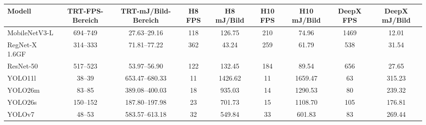 \begin{tabular}{l cc S[table-format=4.0] S[table-format=4.2] S[table-format=4.0] S[table-format=4.2] S[table-format=4.0] S[table-format=4.2]}
\toprule
Modell & TRT-FPS-Bereich & TRT-mJ/Bild-Bereich & {H8 FPS} & {H8 mJ/Bild} & {H10 FPS} & {H10 mJ/Bild} & {DeepX FPS} & {DeepX mJ/Bild} \\
\midrule
MobileNetV3-L & 694--749 & 27.63--29.16 & 118 & 126.75 & 210 & 74.96 & 1469 & 12.01 \\
RegNet-X 1.6GF & 314--333 & 71.81--77.22 & 362 & 43.24 & 259 & 61.79 & 538 & 31.54 \\
ResNet-50 & 517--523 & 53.97--56.90 & 122 & 132.45 & 184 & 89.54 & 656 & 27.65 \\
YOLO11l & 38--39 & 653.47--680.33 & 11 & 1426.62 & 11 & 1659.47 & 63 & 315.23 \\
YOLO26m & 83--85 & 389.08--400.03 & 18 & 935.03 & 14 & 1290.53 & 80 & 239.32 \\
YOLO26s & 150--152 & 187.80--197.98 & 23 & 701.73 & 15 & 1108.70 & 105 & 176.81 \\
YOLOv7 & 48--53 & 583.57--613.18 & 32 & 549.84 & 33 & 601.83 & 83 & 269.44 \\
\bottomrule
\end{tabular}
